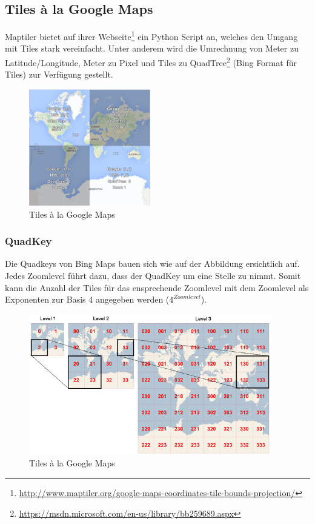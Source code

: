 \subsection{Tiles à la Google Maps}
\label{subsec:tiles}
Maptiler bietet auf ihrer Webseite\footnote{\url{http://www.maptiler.org/google-maps-coordinates-tile-bounds-projection/}} ein Python Script an, welches den Umgang mit Tiles stark vereinfacht. Unter anderem wird die Umrechnung von Meter zu Latitude/Longitude, Meter zu Pixel und Tiles zu QuadTree\footnote{\url{https://msdn.microsoft.com/en-us/library/bb259689.aspx}} (Bing Format für Tiles) zur Verfügung gestellt.

\begin{figure}[H]
\centering
\includegraphics[width=150pt]{images/tiles_a_la_google.png}
\caption[Tiles à la Google Maps]{Tiles à la Google Maps}
\end{figure}

\subsubsection{QuadKey}
Die Quadkeys von Bing Maps bauen sich wie auf der Abbildung ersichtlich auf. Jedes Zoomlevel führt dazu, dass der QuadKey um eine Stelle zu nimmt. Somit kann die Anzahl der Tiles für das ensprechende Zoomlevel mit dem Zoomlevel als Exponenten zur Basis 4 angegeben werden ($4^{Zoomlevel}$).  
\begin{figure}[H]
\centering
\includegraphics[width=300pt]{images/quadkey.png}
\caption[Tiles à la Google Maps]{Tiles à la Google Maps}
\end{figure}

